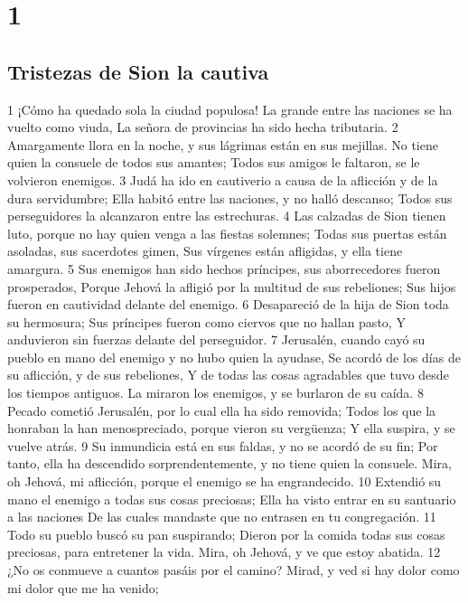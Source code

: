 
\chapter{1}

\section*{Tristezas de Sion la cautiva}

1 ¡Cómo ha quedado sola la ciudad populosa!
La grande entre las naciones se ha vuelto como viuda,
La señora de provincias ha sido hecha tributaria.
2 Amargamente llora en la noche, y sus lágrimas están en sus mejillas.
No tiene quien la consuele de todos sus amantes;
Todos sus amigos le faltaron, se le volvieron enemigos.
3 Judá ha ido en cautiverio a causa de la aflicción y de la dura servidumbre;
Ella habitó entre las naciones, y no halló descanso;
Todos sus perseguidores la alcanzaron entre las estrechuras.
4 Las calzadas de Sion tienen luto, porque no hay quien venga a las fiestas solemnes;
Todas sus puertas están asoladas, sus sacerdotes gimen,
Sus vírgenes están afligidas, y ella tiene amargura.
5 Sus enemigos han sido hechos príncipes, sus aborrecedores fueron prosperados,
Porque Jehová la afligió por la multitud de sus rebeliones;
Sus hijos fueron en cautividad delante del enemigo.
6 Desapareció de la hija de Sion toda su hermosura;
Sus príncipes fueron como ciervos que no hallan pasto,
Y anduvieron sin fuerzas delante del perseguidor.
7 Jerusalén, cuando cayó su pueblo en mano del enemigo y no hubo quien la ayudase,
Se acordó de los días de su aflicción, y de sus rebeliones,
Y de todas las cosas agradables que tuvo desde los tiempos antiguos.
La miraron los enemigos, y se burlaron de su caída.
8 Pecado cometió Jerusalén, por lo cual ella ha sido removida;
Todos los que la honraban la han menospreciado, porque vieron su vergüenza;
Y ella suspira, y se vuelve atrás.
9 Su inmundicia está en sus faldas, y no se acordó de su fin;
Por tanto, ella ha descendido sorprendentemente, y no tiene quien la consuele.
Mira, oh Jehová, mi aflicción, porque el enemigo se ha engrandecido.
10 Extendió su mano el enemigo a todas sus cosas preciosas;
Ella ha visto entrar en su santuario a las naciones
De las cuales mandaste que no entrasen en tu congregación.
11 Todo su pueblo buscó su pan suspirando;
Dieron por la comida todas sus cosas preciosas, para entretener la vida.
Mira, oh Jehová, y ve que estoy abatida.
12 ¿No os conmueve a cuantos pasáis por el camino?
Mirad, y ved si hay dolor como mi dolor que me ha venido;

